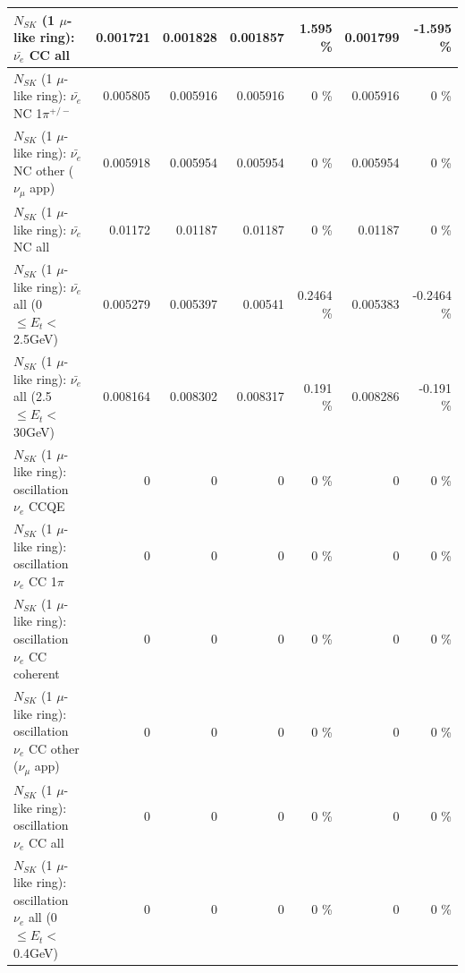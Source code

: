 \begin{table}
\begin{tabular}{| l | r | r | r  r | r  r |}
                            $N_{SK}$ (1 $\mu$-like ring): $\bar{\nu_{e}}$ CC all &        0.001721 &        0.001828 &        0.001857 &    1.595 \%  &        0.001799 &   -1.595 \%  \\ 
\hline
                     $N_{SK}$ (1 $\mu$-like ring): $\bar{\nu_e}$ NC 1$\pi^{+/-}$ &        0.005805 &        0.005916 &        0.005916 &        0 \%  &        0.005916 &        0 \%  \\ 
            $N_{SK}$ (1 $\mu$-like ring): $\bar{\nu_e}$ NC other ($\nu_\mu$ app) &        0.005918 &        0.005954 &        0.005954 &        0 \%  &        0.005954 &        0 \%  \\ 
                            $N_{SK}$ (1 $\mu$-like ring): $\bar{\nu_{e}}$ NC all &         0.01172 &         0.01187 &         0.01187 &        0 \%  &         0.01187 &        0 \%  \\ 
\hline
     $N_{SK}$ (1 $\mu$-like ring): $\bar{\nu_{e}}$ all (0 $\leq E_{t} <$ 2.5GeV) &        0.005279 &        0.005397 &         0.00541 &   0.2464 \%  &        0.005383 &  -0.2464 \%  \\ 
    $N_{SK}$ (1 $\mu$-like ring): $\bar{\nu_{e}}$ all (2.5 $\leq E_{t} <$ 30GeV) &        0.008164 &        0.008302 &        0.008317 &    0.191 \%  &        0.008286 &   -0.191 \%  \\ 
\hline
\hline
\hline
                          $N_{SK}$ (1 $\mu$-like ring): oscillation $\nu_e$ CCQE &               0 &               0 &               0 &        0 \%  &               0 &        0 \%  \\ 
                     $N_{SK}$ (1 $\mu$-like ring): oscillation $\nu_e$ CC 1$\pi$ &               0 &               0 &               0 &        0 \%  &               0 &        0 \%  \\ 
                   $N_{SK}$ (1 $\mu$-like ring): oscillation $\nu_e$ CC coherent &               0 &               0 &               0 &        0 \%  &               0 &        0 \%  \\ 
      $N_{SK}$ (1 $\mu$-like ring): oscillation $\nu_e$ CC other ($\nu_\mu$ app) &               0 &               0 &               0 &        0 \%  &               0 &        0 \%  \\ 
                       $N_{SK}$ (1 $\mu$-like ring): oscillation $\nu_e$  CC all &               0 &               0 &               0 &        0 \%  &               0 &        0 \%  \\ 
\hline
$N_{SK}$ (1 $\mu$-like ring): oscillation $\nu_{e}$ all (0 $\leq E_{t} <$ 0.4GeV) &               0 &               0 &               0 &        0 \%  &               0 &        0 \%  \\ 

\end{tabular}
\end{table}
